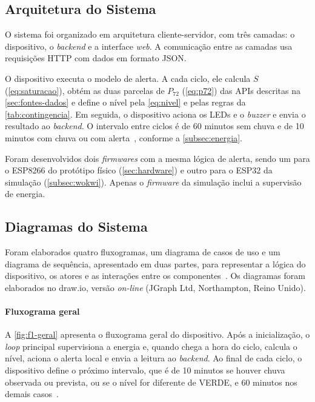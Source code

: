 \subsection{Arquitetura do Sistema}
\label{subsec:arquitetura}

O sistema foi organizado em arquitetura cliente-servidor, com três
camadas: o dispositivo, o \textit{backend} e a interface \textit{web}.
A comunicação entre as camadas usa requisições HTTP com dados em
formato JSON.

O dispositivo executa o modelo de alerta. A cada ciclo, ele calcula
$S$ (\autoref{eq:saturacao}), obtém as duas parcelas de $P_{72}$
(\autoref{eq:p72}) das APIs descritas na \autoref{sec:fontes-dados} e
define o nível pela \autoref{eq:nivel} e pelas regras da
\autoref{tab:contingencia}.
Em seguida, o dispositivo aciona os LEDs e o \textit{buzzer} e envia o
resultado ao \textit{backend}. O intervalo entre ciclos é de 60 minutos
sem chuva e de 10 minutos com chuva ou com alerta~\cite[p.~3]{freitas2021analise}, conforme a \autoref{subsec:energia}.

Foram desenvolvidos dois \textit{firmwares} com a mesma lógica de alerta, sendo um para o ESP8266 do protótipo físico (\autoref{sec:hardware})
e outro para o ESP32 da simulação (\autoref{subsec:wokwi}). Apenas o
\textit{firmware} da simulação inclui a supervisão de energia.

\subsection{Diagramas do Sistema}
\label{subsec:diagramas}

Foram elaborados quatro fluxogramas, um diagrama de casos de uso e um
diagrama de sequência, apresentado em duas partes, para representar a
lógica do dispositivo, os atores e as interações entre os componentes~\cite{sommerville2011engenharia,guedes2011uml}. Os diagramas foram
elaborados no draw.io, versão \textit{on-line} (JGraph Ltd, Northampton,
Reino Unido).

\paragraph*{Fluxograma geral}

A \autoref{fig:f1-geral} apresenta o fluxograma geral do dispositivo.
Após a inicialização, o \textit{loop} principal supervisiona a energia
e, quando chega a hora do ciclo, calcula o nível, aciona o alerta local
e envia a leitura ao \textit{backend}.
Ao final de cada ciclo, o dispositivo define o próximo intervalo, que é de 10 minutos se houver chuva observada ou prevista, ou se o nível for
diferente de VERDE, e 60 minutos nos demais casos~\cite[p.~3]{freitas2021analise}.

